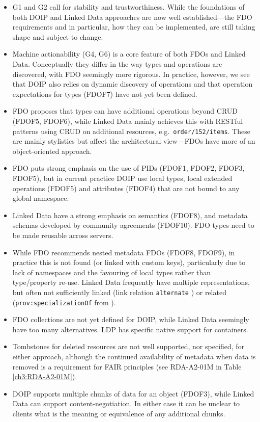 \begin{itemize}
  \item
    G1 and G2 call for stability and trustworthiness. While the foundations of both DOIP and Linked Data approaches are now well established---the FDO requirements and in particular, how they can be implemented, are still taking shape and subject to change.
  \item
    Machine actionability (G4, G6) is a core feature of both FDOs and Linked Data. Conceptually they differ in the way types and operations are discovered, with FDO seemingly more rigorous. In practice, however, we see that DOIP also relies on dynamic discovery of operations and that operation expectations for types (FDOF7) have not yet been defined.
  \item
    FDO proposes that types can have additional operations beyond CRUD (FDOF5, FDOF6), while Linked Data mainly achieves this with RESTful patterns using CRUD on additional resources, e.g.~\texttt{order/152/items}. These are mainly stylistics but affect the architectural view---FDOs have more of an object-oriented approach.
  \item
    FDO puts strong emphasis on the use of PIDs (FDOF1, FDOF2, FDOF3, FDOF5), but in current practice DOIP use local types, local extended operations (FDOF5) and attributes (FDOF4) that are not bound to any global namespace.
  \item
    Linked Data have a strong emphasis on semantics (FDOF8), and metadata schemas developed by community agreements (FDOF10). FDO types need to be made reusable across servers.
  \item
    While FDO recommends nested metadata FDOs (FDOF8, FDOF9), in practice this is not found (or linked with custom keys), particularly due to lack of namespaces and the favouring of local types rather than type/property re-use. Linked Data frequently have multiple representations, but often not sufficiently linked (link relation \texttt{alternate} \cite{Nottingham 2017}) or related (\texttt{prov:specializationOf} from \cite{Lebo 2013a}).
  \item
    FDO collections are not yet defined for DOIP, while Linked Data seemingly have too many alternatives. LDP has specific native support for containers.
  \item
    Tombstones for deleted resources are not well supported, nor specified, for either approach, although the continued availability of metadata when data is removed is a requirement for FAIR principles (see RDA-A2-01M in Table \vref{ch3:RDA-A2-01M}).
  \item
    DOIP supports multiple chunks of data for an object (FDOF3), while Linked Data can support content-negotiation. In either case it can be unclear to clients what is the meaning or equivalence of any additional chunks.
  \end{itemize}


